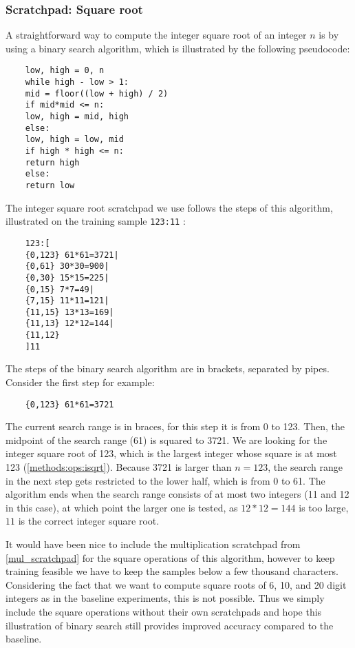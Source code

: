 \subsubsection{Scratchpad: Square root}
\label{sqrt_scratchpad}

A straightforward way to compute the integer square root of an integer $n$ is by using a binary search algorithm, which is illustrated by the following pseudocode:

\begin{lstlisting}
	low, high = 0, n
	while high - low > 1:
	mid = floor((low + high) / 2)
	if mid*mid <= n:
	low, high = mid, high
	else:
	low, high = low, mid 
	if high * high <= n:
	return high
	else:
	return low
\end{lstlisting}

\noindent
The integer square root scratchpad we use follows the steps of this algorithm, illustrated on the training sample \verb|123:11| :

\begin{lstlisting}
	123:[
	{0,123} 61*61=3721| 
	{0,61} 30*30=900|
	{0,30} 15*15=225|
	{0,15} 7*7=49|
	{7,15} 11*11=121|
	{11,15} 13*13=169|
	{11,13} 12*12=144|
	{11,12}
	]11
\end{lstlisting}

The steps of the binary search algorithm are in brackets, separated by pipes.
Consider the first step for example:

\begin{lstlisting}
	{0,123} 61*61=3721
\end{lstlisting}

The current search range is in braces, for this step it is from 0 to 123.
Then, the midpoint of the search range (61) is squared to 3721.
We are looking for the integer square root of 123, which is the largest integer whose square is at most 123 (\cref{methods:ops:isqrt}). Because 3721 is larger than $n=123$, the search range in the next step gets restricted to the lower half, which is from 0 to 61.
The algorithm ends when the search range consists of at most two integers (11 and 12 in this case), at which point the larger one is tested, as $12*12=144$ is too large, $11$ is the correct integer square root.


It would have been nice to include the multiplication scratchpad from \cref{mul_scratchpad} for the square operations of this algorithm, however to keep training feasible we have to keep the samples below a few thousand characters. Considering the fact that we want to compute square roots of 6, 10, and 20 digit integers as in the baseline experiments, this is not possible.
Thus we simply include the square operations without their own scratchpads and hope this illustration of binary search still provides improved accuracy compared to the baseline.





